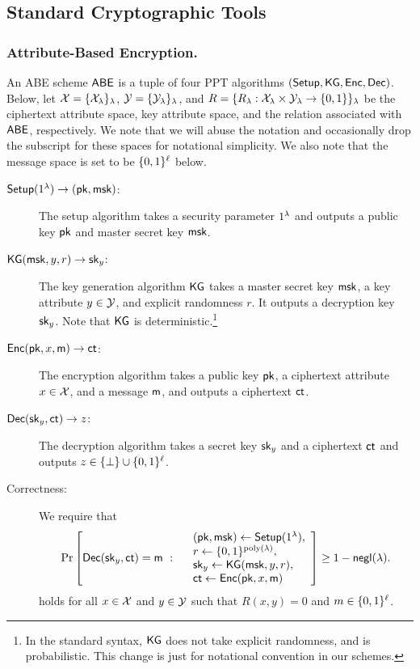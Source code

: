 \subsection{Standard Cryptographic Tools}\label{sec:standard_crypto}


\subsubsection*{Attribute-Based Encryption.}

\begin{definition}\label{def:ABE}
An ABE scheme $\mathsf{ABE}$ is a tuple of four PPT algorithms $(\mathsf{Setup}, \mathsf{KG},
\mathsf{Enc},\allowbreak \mathsf{Dec})$. 
Below, let $\mathcal{X}=\{\mathcal{X}_\lambda\}_\lambda$, $\mathcal{Y}=\{\mathcal{Y}_\lambda\}_\lambda$, and $R=\{R_\lambda:\mathcal{X}_\lambda \times \mathcal{Y}_\lambda \rightarrow \{0,1\} \}_\lambda$ be the ciphertext attribute space, key attribute space, and the relation associated with $\mathsf{ABE}$, respectively.
We note that we will abuse the notation and occasionally drop the subscript for these spaces for notational simplicity.
We also note that the message space is set to be $\{0,1\}^\ell$ below. 
\begin{description}
\item[$\mathsf{Setup}(1^\lambda)\rightarrow(\mathsf{pk},\mathsf{msk})$:] The setup algorithm takes a security parameter $1^\lambda$ and outputs a public key $\mathsf{pk}$ and master secret key $\mathsf{msk}$.

\item[$\mathsf{KG}(\mathsf{msk},y, r)\rightarrow\mathsf{sk}_y$:] The key generation algorithm $\mathsf{KG}$
takes a master secret key $\mathsf{msk}$, a key attribute $y \in
\mathcal{Y}$, and explicit randomness $r$. It outputs a decryption key
$\mathsf{sk}_y$.
Note that $\mathsf{KG}$ is deterministic.\footnote{In the standard syntax, $\mathsf{KG}$ does not take explicit randomness, and is probabilistic. This change is just for notational convention in our schemes.}

\item[$\mathsf{Enc}(\mathsf{pk},x,\mathsf{m})\rightarrow\mathsf{ct}$:] The encryption algorithm takes a
public key $\mathsf{pk}$, a ciphertext attribute $x \in \mathcal{X}$, and a
message $\mathsf{m}$, and outputs a ciphertext $\mathsf{ct}$.

\item[$\mathsf{Dec}(\mathsf{sk}_y,\mathsf{ct})\rightarrow z$:] The decryption algorithm takes a
secret key $\mathsf{sk}_y$ and a ciphertext $\mathsf{ct}$ and outputs
$z \in \{ \bot \} \cup \{0,1\}^\ell$.

\item[Correctness:] We require that
\[
\Pr\left[
\mathsf{Dec}(\mathsf{sk}_y, \mathsf{ct}) = \mathsf{m}
 \ :
\begin{array}{rl}
 &(\mathsf{pk},\mathsf{msk}) \leftarrow \mathsf{Setup}(1^\lambda),\\
 &r \leftarrow \{0,1\}^{{\mathrm{poly}}(\lambda)},\\
 & \mathsf{sk}_y \leftarrow \mathsf{KG}(\mathsf{msk},y, r), \\
 &\mathsf{ct} \leftarrow \mathsf{Enc}(\mathsf{pk},x,\mathsf{m})
\end{array}
\right] \ge 1 -{\mathsf{negl}}(\lambda).
\]
holds for all $x\in \mathcal{X}$ and $y\in \mathcal{Y}$ such that $R(x,y)=0$ and $m\in \{0,1\}^\ell$.
\end{description}
\end{definition}

